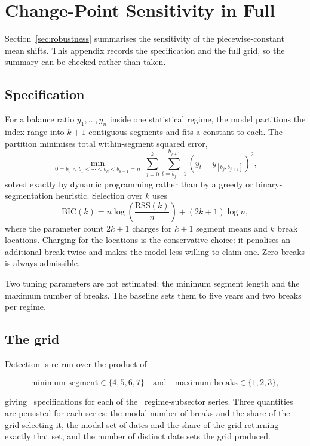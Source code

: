 
\section{Change-Point Sensitivity in Full}
\label{sec:changepoints}

Section~\ref{sec:robustness} summarises the sensitivity of the piecewise-constant
mean shifts. This appendix records the specification and the full grid, so the
summary can be checked rather than taken.

\subsection{Specification}

For a balance ratio $y_1,\dots,y_n$ inside one statistical regime, the model
partitions the index range into $k+1$ contiguous segments and fits a constant to
each. The partition minimises total within-segment squared error,
\[
\min_{0 = b_0 < b_1 < \cdots < b_k < b_{k+1} = n}
\ \sum_{j=0}^{k} \sum_{t = b_j + 1}^{b_{j+1}} \left(y_t - \bar{y}_{[b_j, b_{j+1}]}\right)^2,
\]
solved exactly by dynamic programming rather than by a greedy or binary-segmentation
heuristic. Selection over $k$ uses
\[
\mathrm{BIC}(k) = n \log\!\left(\frac{\mathrm{RSS}(k)}{n}\right) + (2k+1)\log n,
\]
where the parameter count $2k+1$ charges for $k+1$ segment means and $k$ break
locations. Charging for the locations is the conservative choice: it penalises an
additional break twice and makes the model less willing to claim one. Zero breaks is
always admissible.

Two tuning parameters are not estimated: the minimum segment length and the maximum
number of breaks. The baseline sets them to five years and two breaks per regime.

\subsection{The grid}

Detection is re-run over the product of

\[
\text{minimum segment} \in \{4, 5, 6, 7\}
\quad \text{and} \quad
\text{maximum breaks} \in \{1, 2, 3\},
\]

giving \BreakSpecifications\ specifications for each of the \BreakSeries\
regime-subsector series. Three quantities are persisted for each series: the modal
number of breaks and the share of the grid selecting it, the modal set of dates and
the share of the grid returning exactly that set, and the number of distinct date
sets the grid produced.


